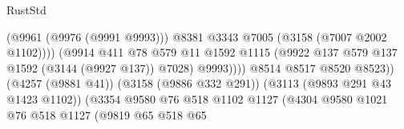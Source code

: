 \begin{lexlean}{RustStd}
\begin{coremodule}
                                                          (@9961 (@9976 (@9991 @9993)))
                                                          @8381
                                                          @3343
                                                          @7005
                                                          (@3158 (@7007 @2002 @1102))))
                                                      (@9914
                                                        @411
                                                        @78
                                                        @579
                                                        @11
                                                        @1592
                                                        @1115
                                                        (@9922
                                                          @137
                                                          @579
                                                          @137
                                                          @1592
                                                          (@3144 (@9927 @137))
                                                          @7028)
                                                        @9993))))
                                                @8514
                                                @8517
                                                @8520
                                                @8523))
                                            (@4257 (@9881 @41))
                                            (@3158 (@9886 @332 @291))
                                            (@3113 (@9893 @291 @43 @1423 @1102))
                                            (@3354
                                              @9580
                                              @76
                                              @518
                                              @1102
                                              @1127
                                              (@4304
                                                @9580
                                                @1021
                                                @76
                                                @518
                                                @1127
                                                (@9819
                                                  @65
                                                  @518
                                                  @65

\end{coremodule}
\end{lexlean}
